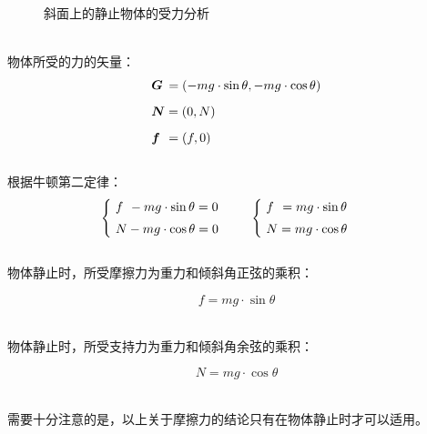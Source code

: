 \documentclass[UTF8]{ctexart}
\newcommand*{\veb}[1]{\vb*{#1}}
\begin{document}
\begin{figure}[h]
\begin{center}
            \caption{斜面上的静止物体的受力分析}
        \end{center}
    \end{figure}\\
    物体所受的力的矢量：
    \begin{align}
        &\veb{G}\hspace{2.0pt}=(-mg\cdot\sin{\theta},-mg\cdot\cos{\theta})\\[2mm]
        &\veb{N}=(0,N)\\[2mm]
        &\veb{f}\hspace{4.0pt}=(f,0)
    \end{align}\\
    根据牛顿第二定律：
    \begin{align}
        &\begin{cases}
            ~f\hspace{4.0pt}-mg\cdot\sin{\theta}=0\\[1mm]
            ~N-mg\cdot\cos{\theta}=0
        \end{cases}~~~~
        \begin{cases}
            ~f\hspace{4.0pt}=mg\cdot\sin{\theta}\\[1mm]
            ~N=mg\cdot\cos{\theta}
        \end{cases}
    \end{align}\\[1mm]
    物体静止时，所受摩擦力为重力和倾斜角正弦的乘积：
    \begin{large}
        \begin{equation*}
            f=mg\cdot \sin{\theta}
        \end{equation*}
    \end{large}\\
    物体静止时，所受支持力为重力和倾斜角余弦的乘积：
    \begin{large}
        \begin{equation*}
            N=mg\cdot \cos{\theta}
        \end{equation*}
    \end{large}\\
    需要十分注意的是，以上关于摩擦力的结论只有在物体静止时才可以适用。
\end{document}
